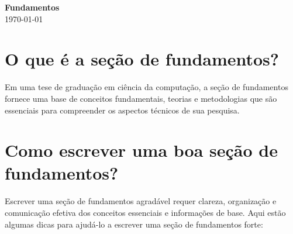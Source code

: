 \documentclass[12pt,a4paper, brazil]{article}
\begin{document}
\begin{center}
{\textbf {\huge Fundamentos}}\\[5mm]
\today\\[5mm] %
\end{center}



\section{O que é a seção de fundamentos?}

Em uma tese de graduação em ciência da computação, a seção de fundamentos fornece uma base de conceitos fundamentais, teorias e metodologias que são essenciais para compreender os aspectos técnicos de sua pesquisa. 

\section{Como escrever uma boa seção de fundamentos?}

Escrever uma seção de fundamentos agradável requer clareza, organização e comunicação efetiva dos conceitos essenciais e informações de base. Aqui estão algumas dicas para ajudá-lo a escrever uma seção de fundamentos forte:
\end{document}
